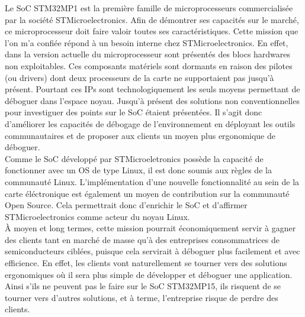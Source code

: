 Le SoC STM32MP1 est la première famille de microprocesseurs commercialisée par
la société STMicroelectronics. Afin de démontrer ses capacités sur le marché,
ce microprocesseur doit faire valoir toutes ses caractéristiques. Cette
mission que l'on m'a confiée répond à un besoin interne chez
STMicroelectronics.  En effet, dans la version actuelle du microprocesseur
sont présentés des blocs hardwares non exploitables. Ces composants matériels
sont dormants en raison des pilotes (ou drivers) dont deux processeurs de la
carte ne supportaient pas jusqu'à présent.  Pourtant ces IPs sont
technologiquement les seuls moyens permettant de déboguer dans l'espace noyau.
Jusqu'à présent des solutions non conventionnelles pour investiguer des points
sur le SoC étaient présentées. Il s'agit donc d'améliorer les capacités de
débogage de l'environnement en déployant les outils communautaires et de
proposer aux clients un moyen plus ergonomique de déboguer. \\

Comme le SoC développé par STMicroeletronics possède la capacité de
fonctionner avec un OS de type Linux, il est donc soumis aux règles de la
communauté Linux. L'implémentation d'une nouvelle fonctionnalité au sein de la
carte éléctronique est également un moyen de contribution sur la communauté
Open Source. Cela permettrait donc d'enrichir le SoC et d'affirmer
STMicroelectronics comme acteur du noyau Linux. \\

À moyen et long termes, cette mission pourrait économiquement servir à gagner
des clients tant en marché de masse qu'à des entreprises consommatrices de
semiconducteurs ciblées, puisque cela servirait à déboguer plus facilement et
avec efficience. En effet, les clients vont naturellement se tourner vers des
solutions ergonomiques où il sera plus simple de développer et déboguer une
application. Ainsi s'ils ne peuvent pas le faire sur le SoC STM32MP15, ils
risquent de se tourner vers d'autres solutions, et à terme, l'entreprise
risque de perdre des clients. \\
